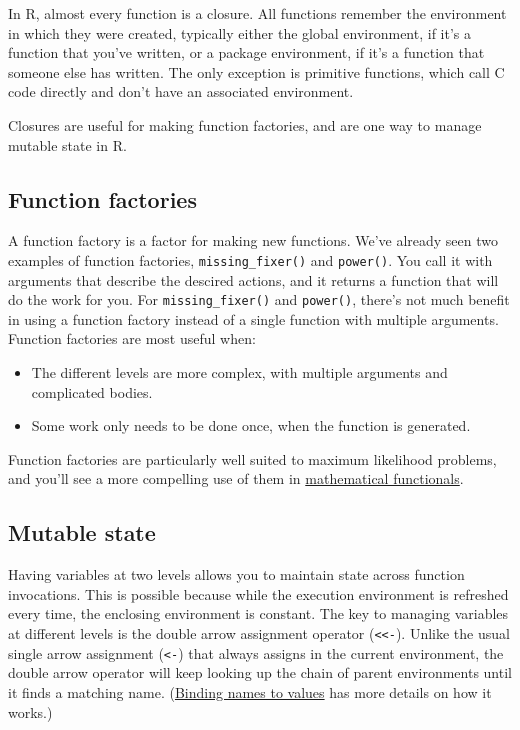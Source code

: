 In R, almost every function is a closure. All functions remember the
environment in which they were created, typically either the global
environment, if it's a function that you've written, or a package
environment, if it's a function that someone else has written. The only
exception is primitive functions, which call C code directly and don't
have an associated environment. 

Closures are useful for making function factories, and are one way to
manage mutable state in R.

\subsection{Function factories}

A function factory is a factor for making new functions. We've already
seen two examples of function factories, \texttt{missing\_fixer()} and
\texttt{power()}. You call it with arguments that describe the descired
actions, and it returns a function that will do the work for you. For
\texttt{missing\_fixer()} and \texttt{power()}, there's not much benefit
in using a function factory instead of a single function with multiple
arguments. Function factories are most useful when:

\begin{itemize}
\item
  The different levels are more complex, with multiple arguments and
  complicated bodies.
\item
  Some work only needs to be done once, when the function is generated.
\end{itemize}

Function factories are particularly well suited to maximum likelihood
problems, and you'll see a more compelling use of them in
\hyperref[functionals-math]{mathematical functionals}.

\subsection{Mutable state}\label{mutable-state}

Having variables at two levels allows you to maintain state across
function invocations. This is possible because while the execution
environment is refreshed every time, the enclosing environment is
constant. The key to managing variables at different levels is the
double arrow assignment operator (\texttt{\textless{}\textless{}-}).
Unlike the usual single arrow assignment (\texttt{\textless{}-}) that
always assigns in the current environment, the double arrow operator
will keep looking up the chain of parent environments until it finds a
matching name. (\hyperref[binding]{Binding names to values} has more
details on how it works.) \indexc{<<-} 

